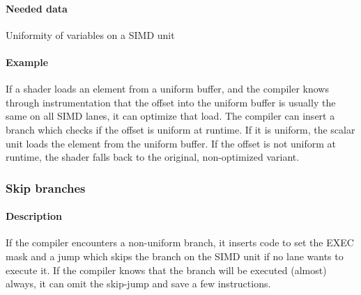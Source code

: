 \paragraph{Needed data} Uniformity of variables on a SIMD unit
\paragraph{Example} If a shader loads an element from a uniform buffer, and the compiler knows through instrumentation that the offset into the uniform buffer is usually the same on all SIMD lanes, it can optimize that load.
The compiler can insert a branch which checks if the offset is uniform at runtime. If it is uniform, the scalar unit loads the element from the uniform buffer.
If the offset is not uniform at runtime, the shader falls back to the original, non-optimized variant.

\subsubsection{Skip branches}
\paragraph{Description} If the compiler encounters a non-uniform branch, it inserts code to set the EXEC mask and a jump which skips the branch on the SIMD unit if no lane wants to execute it. If the compiler knows that the branch will be executed (almost) always, it can omit the skip-jump and save a few instructions.
